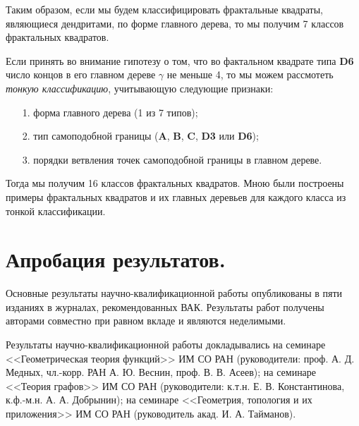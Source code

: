 Таким образом, если мы будем классифицировать фрактальные квадраты, являющиеся дендритами, по форме главного дерева, то мы получим 7 классов фрактальных квадратов.

Если принять во внимание гипотезу о том, что во фактальном квадрате типа {\bf D6} число концов в его главном дереве $\gamma$ не меньше 4, то мы можем рассмотеть {\em тонкую классификацию}, учитывающую следующие признаки:
\begin{itemize}[nolistsep]
	\item[1.] форма главного дерева (1 из 7 типов);
	\item[2.] тип самоподобной границы ({\bf A}, {\bf B}, {\bf C}, {\bf D3} или {\bf D6});
	\item[3.] порядки ветвления точек самоподобной границы в главном дереве.
\end{itemize}
Тогда мы получим 16 классов фрактальных квадратов. 
Мною были построены примеры фрактальных квадратов и их главных деревьев для каждого класса из тонкой классификации.



\section{Апробация результатов.}

Основные результаты научно-квалификационной работы опубликованы в пяти изданиях \cite{DST2021, DST2022, TD2022fs, TD2023fs, VDT2020} в журналах, рекомендованных ВАК.
Результаты работ \cite{DST2021, DST2022, TD2022fs, TD2023fs, VDT2020} получены авторами совместно при равном вкладе и являются неделимыми.

Результаты научно-квалификационной работы докладывались на семинаре <<Геометрическая теория функций>> ИМ СО РАН (руководители:
проф. А. Д. Медных, чл.-корр. РАН А. Ю. Веснин, проф. В. В. Асеев); на семинаре <<Теория графов>> ИМ СО РАН (руководители: к.т.н. Е. В. Константинова, к.ф.-м.н. А. А. Добрынин); на семинаре <<Геометрия, топология и их приложения>> ИМ СО РАН (руководитель акад. И. А. Тайманов).

